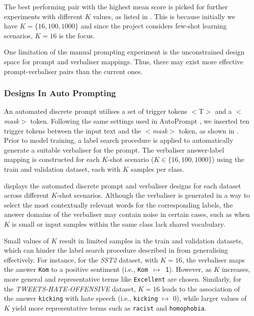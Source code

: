 The best performing pair with the highest mean score is picked for further experiments with different $K$ values, as listed in . This is because initially we have $K = \{16, 100, 1000\}$ and since the project considers few-shot learning scenarios, $K = 16$ is the focus. 


One limitation of the manual prompting experiment is the unconstrained design space for prompt and verbaliser mappings. Thus, there may exist more effective prompt-verbaliser pairs than the current ones. 

\subsubsection{Designs In Auto Prompting} \label{sec:eval-auto}
An automated discrete prompt utilises a set of trigger tokens $<$T$>$ and a $<$\textit{mask}$>$ token. Following the same settings used in AutoPrompt \cite{shin2020autoprompt}, we inserted ten trigger tokens between the input text and the $<$\textit{mask}$>$ token, as shown in . Prior to model training, a label search procedure is applied to automatically generate a suitable verbaliser for the prompt. The verbaliser answer-label mapping is constructed for each  
$K$-shot scenario ($K \in \{16, 100, 1000\}$) using the train and validation dataset, each with $K$ samples per class.



 displays the automated discrete prompt and verbaliser designs for each dataset across different $K$-shot scenarios. Although the verbaliser is generated in a way to select the most contextually relevant words for the corresponding labels, the answer domains of the verbaliser may contain noise in certain cases, such as when $K$ is small or input samples within the same class lack shared vocabulary. 

Small values of $K$ result in limited samples in the train and validation datasets, which can hinder the label search procedure described in  from generalising effectively. For instance, for the \textit{SST2} dataset, with $K=16$, the verbaliser maps the answer \texttt{Kom} to a positive sentiment (i.e., \texttt{Kom $\mapsto$ 1}). However, as $K$ increases, more general and representative terms like \texttt{Excellent} are chosen. Similarly, for the \textit{TWEETS-HATE-OFFENSIVE} dataset, $K=16$ leads to the association of the answer \texttt{kicking} with hate speech (i.e., \texttt{kicking} $\mapsto$ 0), while larger values of $K$ yield more representative terms such as \texttt{racist} and \texttt{homophobia}.


